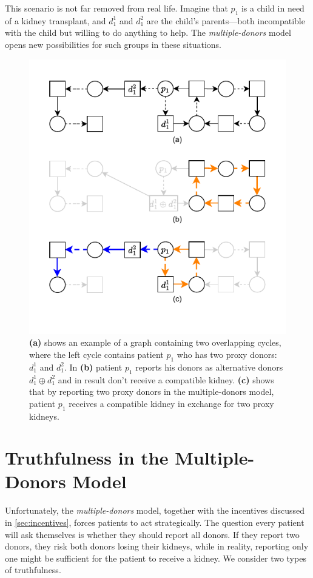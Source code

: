 This scenario is not far removed from real life. Imagine that $p_1$ is a child in need of a kidney transplant, and $d_1^1$ and $d_1^2$ are the child’s parents—both incompatible with the child but willing to do anything to help. The \textit{multiple-donors} model opens new possibilities for such groups in these situations.

\begin{figure}
    \centering
    \includegraphics{data/incentive_motivation_example2.pdf}
    \caption[An example showing the benefit of reporting two proxy donors in multiple-donors model]{\textbf{(a)} shows an example of a graph containing two overlapping cycles, where the left cycle contains patient $p_1$ who has two proxy donors: $d_1^1$ and $d_1^2$. In \textbf{(b)} patient $p_1$ reports his donors as alternative donors $d_1^1 \oplus d_1^2$ and in result don't receive a compatible kidney. \textbf{(c)} shows that by reporting two proxy donors in the multiple-donors model, patient $p_1$ receives a compatible kidney in exchange for two proxy kidneys.}
    \label{fig:incentive_motivation_example2}
\end{figure}

\section{Truthfulness in the Multiple-Donors Model}
Unfortunately, the \textit{multiple-donors} model, together with the incentives discussed in \autoref{sec:incentives}, forces patients to act strategically. The question every patient will ask themselves is whether they should report all donors. If they report two donors, they risk both donors losing their kidneys, while in reality, reporting only one might be sufficient for the patient to receive a kidney. We consider two types of truthfulness.

